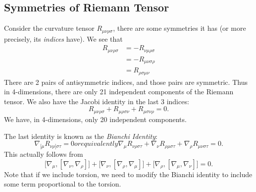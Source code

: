\subsection{Symmetries of Riemann Tensor}
Consider the curvature tensor $R_{\mu\nu\rho\sigma}$, there are
some symmetries it has (or more precisely, its \emph{indices}
have).  We see that
\begin{subequations}
\begin{align}
R_{\mu\nu\rho\sigma}
&=-R_{\nu\mu\rho\sigma}\\
&=-R_{\mu\nu\sigma\rho}\\
&=R_{\rho\sigma\mu\nu}
\end{align}
\end{subequations}
There are 2 pairs of antisymmetric indices, and those pairs are
symmetric. Thus in 4-dimensions, there are only 21 independent
components of the Riemann tensor. We also have the
Jacobi
identity in the last 3 indices:
\begin{equation}
R_{\mu\nu\rho\sigma}+R_{\mu\rho\sigma\nu}+R_{\mu\sigma\nu\rho}=0.
\end{equation}
We have, in 4-dimensions, only 20 independent components.

The last identity is known as
the \emph{Bianchi Identity}:
\begin{subequations}
\begin{equation}
\nabla_{[\mu}R_{\nu\rho]\sigma\tau}=0
\end{equation}
or equivalently
\begin{equation}
\nabla_{\mu}R_{\nu\rho\sigma\tau}+
\nabla_{\nu}R_{\rho\mu\sigma\tau}+
\nabla_{\rho}R_{\mu\nu\sigma\tau}=0.
\end{equation}
\end{subequations}
This actually follows from
\begin{equation}
\bigl[\nabla_{\mu},[\nabla_{\nu},\nabla_{\rho}]\bigr]+
\bigl[\nabla_{\nu},[\nabla_{\rho},\nabla_{\mu}]\bigr]+
\bigl[\nabla_{\rho},[\nabla_{\mu},\nabla_{\nu}]\bigr]=0.
\end{equation}
Note that if we include torsion, we need to modify the Bianchi
identity to include some term proportional to the torsion.

